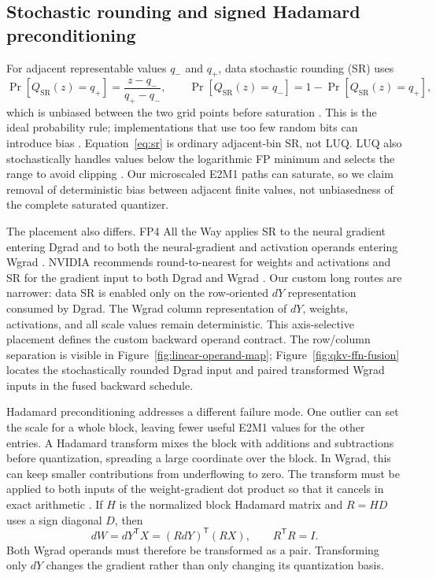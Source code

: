 \subsection{Stochastic rounding and signed Hadamard preconditioning}

For adjacent representable values $q_-$ and $q_+$, data stochastic rounding
(SR) uses
\begin{equation}
  \Pr[Q_{\mathrm{SR}}(z)=q_+]
  =\frac{z-q_-}{q_+-q_-}, \qquad
  \Pr[Q_{\mathrm{SR}}(z)=q_-]=1-\Pr[Q_{\mathrm{SR}}(z)=q_+],
  \label{eq:sr}
\end{equation}
which is unbiased between the two grid points before saturation
\cite{gupta2015limited,ozkara2025sr}. This is the ideal probability rule;
implementations that use too few random bits can introduce bias
\cite{fitzgibbon2025fewbits}. Equation~\ref{eq:sr} is ordinary adjacent-bin SR,
not LUQ. LUQ also stochastically handles values below the logarithmic FP
minimum and selects the range to avoid clipping \cite{chmiel2023accurate}. Our
microscaled E2M1 paths can saturate, so we claim removal of deterministic bias
between adjacent finite values, not unbiasedness of the complete saturated
quantizer.

The placement also differs. FP4 All the Way applies SR to the neural gradient
entering Dgrad and to both the neural-gradient and activation operands entering
Wgrad \cite{chmiel2025fp4alltheway}. NVIDIA recommends round-to-nearest for
weights and activations and SR for the gradient input to both Dgrad and Wgrad
\cite{nvidia2025nvfp4}. Our custom long routes are narrower: data SR is enabled
only on the row-oriented $dY$ representation consumed by Dgrad. The Wgrad
column representation of $dY$, weights, activations, and all scale values
remain deterministic. This axis-selective placement defines the custom
backward operand contract.
The row/column separation is visible in
Figure~\ref{fig:linear-operand-map}; Figure~\ref{fig:qkv-ffn-fusion} locates
the stochastically rounded Dgrad input and paired transformed Wgrad inputs in
the fused backward schedule.

Hadamard preconditioning addresses a different failure mode. One outlier can
set the scale for a whole block, leaving fewer useful E2M1 values for the other
entries. A Hadamard transform mixes the block with additions and subtractions
before quantization, spreading a large coordinate over the block. In Wgrad,
this can keep smaller contributions from underflowing to zero. The transform
must be applied to both inputs of the weight-gradient dot product so that it
cancels in exact arithmetic
\cite{ashkboos2024quarot,tseng2025mxfp4,nvidia2025nvfp4}. If $H$ is the
normalized block Hadamard matrix and $R=HD$ uses a sign diagonal $D$, then
\begin{equation}
  dW=dY^{\mathsf T}X=(R dY)^{\mathsf T}(R X),
  \qquad R^{\mathsf T}R=I.
  \label{eq:paired-rht}
\end{equation}
Both Wgrad operands must therefore be transformed as a pair. Transforming only
$dY$ changes the gradient rather than only changing its quantization basis.


